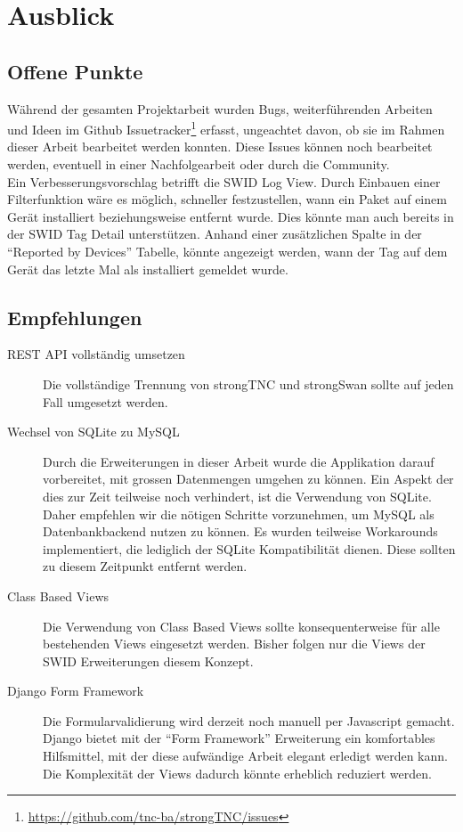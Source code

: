 \chapter{Ausblick}

\section{Offene Punkte} 
Während der gesamten Projektarbeit wurden Bugs, weiterführenden Arbeiten und
Ideen im Github
Issuetracker\footnote{\url{https://github.com/tnc-ba/strongTNC/issues}} erfasst,
ungeachtet davon, ob sie im Rahmen dieser Arbeit bearbeitet werden konnten.
Diese Issues können noch bearbeitet werden, eventuell in einer Nachfolgearbeit
oder durch die Community.\\
Ein Verbesserungsvorschlag betrifft die SWID Log View. Durch Einbauen
einer Filterfunktion wäre es möglich, schneller festzustellen, wann ein Paket auf
einem Gerät installiert beziehungsweise entfernt wurde. Dies könnte man auch
bereits in der SWID Tag Detail unterstützen. Anhand einer zusätzlichen Spalte in
der \enquote{Reported by Devices} Tabelle, könnte angezeigt werden, wann der Tag
auf dem Gerät das letzte Mal als installiert gemeldet wurde.


\section{Empfehlungen} 

\begin{description} 

	\item[REST API vollständig umsetzen] Die vollständige Trennung von strongTNC
	und strongSwan sollte auf jeden Fall umgesetzt werden.
	
	\item[Wechsel von SQLite zu MySQL] Durch die Erweiterungen in dieser Arbeit
	wurde die Applikation darauf vorbereitet, mit grossen Datenmengen umgehen zu
	können. Ein Aspekt der dies zur Zeit teilweise noch verhindert, ist die
	Verwendung von SQLite. Daher empfehlen wir die nötigen Schritte vorzunehmen, um
	MySQL als Datenbankbackend nutzen zu können. Es wurden teilweise Workarounds
	implementiert, die lediglich der SQLite Kompatibilität dienen. Diese sollten zu
	diesem Zeitpunkt entfernt werden.
	
	\item[Class Based Views] Die Verwendung von Class Based Views sollte
	konsequenterweise für alle bestehenden Views eingesetzt werden. Bisher folgen
	nur die Views der SWID Erweiterungen diesem Konzept.
	
	\item[Django Form Framework] Die Formularvalidierung wird derzeit noch manuell
	per Javascript gemacht. Django bietet mit der \enquote{Form Framework}
	Erweiterung ein komfortables Hilfsmittel, mit der diese aufwändige Arbeit
	elegant erledigt werden kann. Die Komplexität der Views dadurch könnte
	erheblich reduziert werden.
	
\end{description}